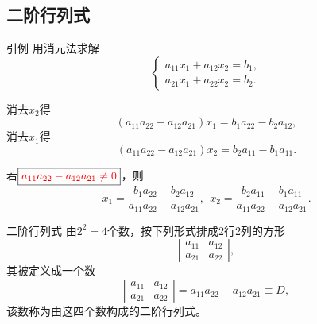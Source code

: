 \subsection{二阶行列式}

\begin{frame}
    \begin{exampleblock}{引例}
      用消元法求解
      $$
      \left \lbrace
      \begin{array}{l}
        a_{11} x_1 + a_{12} x_2 = b_1, \\[0.2cm]
        a_{21} x_1 + a_{22} x_2 = b_2.
      \end{array}
      \right.
      $$
    \end{exampleblock}
    \pause 
    消去$x_2$得
    $$
    (a_{11}a_{22}-a_{12}a_{21})x_1 = b_1 a_{22} - b_2 a_{12},
    $$
    消去$x_1$得
    $$
    (a_{11}a_{22}-a_{12}a_{21})x_2 = b_2 a_{11} - b_1 a_{11}.
    $$
    \pause
    
    若$\boxed{\textcolor{red}{a_{11}a_{22}-a_{12}a_{21}\ne0}}$，则
    $$
    x_1 = \frac{b_1 a_{22} - b_2 a_{12}}{a_{11}a_{22}-a_{12}a_{21}}, \ \
    x_2 = \frac{b_2 a_{11} - b_1 a_{11}}{a_{11}a_{22}-a_{12}a_{21}}.
    $$
\end{frame}

\begin{frame}

    \begin{block}{二阶行列式}
      由$2^2=4$个数，按下列形式排成2行2列的方形
      $$
      \left|
      \begin{array}{cc}
        a_{11} & a_{12} \\[0.2cm]
        a_{21} & a_{22} 
      \end{array}
      \right|,
      $$
      其被定义成一个数
      $$
      \left|
      \begin{array}{cc}
        a_{11} & a_{12} \\[0.2cm]
        a_{21} & a_{22} 
      \end{array}
      \right| = a_{11}a_{22} - a_{12}a_{21} \equiv D,
      $$
      该数称为由这四个数构成的二阶行列式。
    \end{block}

\end{frame}

